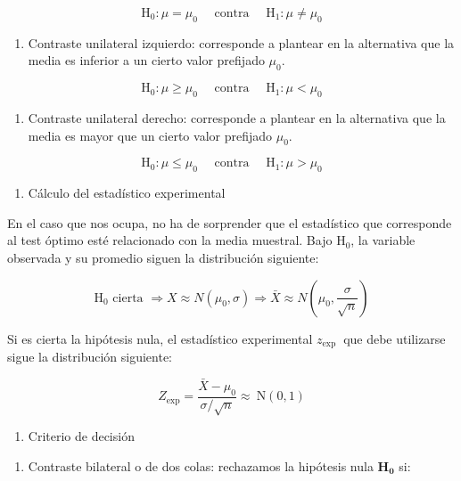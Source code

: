 \documentclass[
]{article}
\providecommand{\tightlist}{%
  \setlength{\itemsep}{0pt}\setlength{\parskip}{0pt}}
\begin{document}
\[
\mathrm{H}_{0}: \mu=\mu_{0} \quad \text { contra } \quad \mathrm{H}_{1}: \mu \neq \mu_{0}
\]

\begin{enumerate}
\def\labelenumi{\alph{enumi})}
\setcounter{enumi}{1}
\tightlist
\item
  Contraste unilateral izquierdo: corresponde a plantear en la alternativa que la media es inferior a un cierto valor prefijado \(\mu_{0}\).
\end{enumerate}

\[
\mathrm{H}_{0}: \mu \geq \mu_{0} \quad \text { contra } \quad \mathrm{H}_{1}: \mu<\mu_{0}
\]

\begin{enumerate}
\def\labelenumi{\alph{enumi})}
\setcounter{enumi}{2}
\tightlist
\item
  Contraste unilateral derecho: corresponde a plantear en la alternativa que la media es mayor que un cierto valor prefijado \(\mu_{0}\).
\end{enumerate}

\[
\mathrm{H}_{0}: \mu \leq \mu_{0} \quad \text { contra } \quad \mathrm{H}_{1}: \mu>\mu_{0}
\]

\begin{enumerate}
\def\labelenumi{\arabic{enumi})}
\setcounter{enumi}{1}
\tightlist
\item
  Cálculo del estadístico experimental
\end{enumerate}

En el caso que nos ocupa, no ha de sorprender que el estadístico que corresponde al test óptimo esté relacionado con la media muestral. Bajo \(\mathrm{H}_{0}\), la variable observada y su promedio siguen la distribución siguiente:

\[
\mathrm{H}_{0} \text { cierta } \Rightarrow X \approx N\left(\mu_{0}, \sigma\right) \Rightarrow \bar{X} \approx N\left(\mu_{0}, \frac{\sigma}{\sqrt{n}}\right)
\]

Si es cierta la hipótesis nula, el estadístico experimental \(z_{\text {exp }}\) que debe utilizarse sigue la distribución siguiente:

\[
Z_{\exp }=\frac{\bar{X}-\mu_{0}}{\sigma / \sqrt{n}} \approx \mathrm{~N}(0,1)
\]

\begin{enumerate}
\def\labelenumi{\arabic{enumi})}
\setcounter{enumi}{2}
\tightlist
\item
  Criterio de decisión
\end{enumerate}

\begin{enumerate}
\def\labelenumi{\alph{enumi})}
\tightlist
\item
  Contraste bilateral o de dos colas: rechazamos la hipótesis nula \(\mathbf{H}_{\mathbf{0}}\) si:
\end{enumerate}
\end{document}
